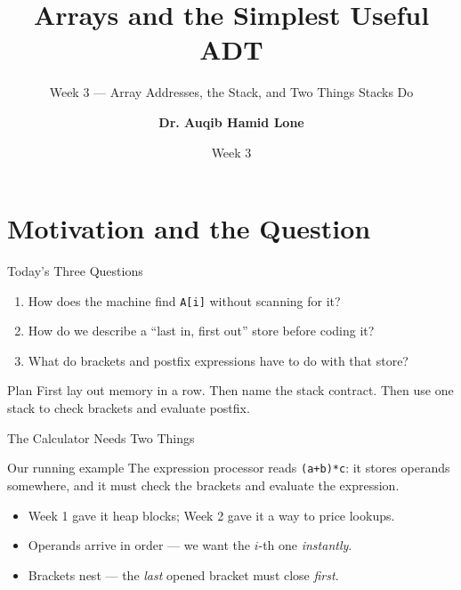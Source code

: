 \documentclass[aspectratio=169]{beamer}
\title{Arrays and the Simplest Useful ADT}
\subtitle{Week 3 --- Array Addresses, the Stack, and Two Things Stacks Do}
\author[Dr. Auqib Hamid Lone]{\textbf{Dr. Auqib Hamid Lone}}
\institute[GCET Ganderbal]{PCC CS-301: Data Structures\\GCET, Ganderbal}
\date[Week 3]{\small Week 3}
\begin{document}
\frame{\titlepage}

\section{Motivation and the Question}

\begin{frame}{Today's Three Questions}
  \begin{enumerate}
    \item How does the machine find \texttt{A[i]} without scanning for it?
    \item How do we describe a ``last in, first out'' store before coding it?
    \item What do brackets and postfix expressions have to do with that store?
  \end{enumerate}
  \vspace{0.2cm}
  \begin{exampleblock}{Plan}
    First lay out memory in a row. Then name the stack contract. Then use one
    stack to check brackets and evaluate postfix.
  \end{exampleblock}
\end{frame}

\begin{frame}{The Calculator Needs Two Things}
  \begin{alertblock}{Our running example}
    The expression processor reads \texttt{(a+b)*c}: it stores operands
    somewhere, and it must check the brackets and evaluate the expression.
  \end{alertblock}
  \begin{itemize}
    \item Week 1 gave it heap blocks; Week 2 gave it a way to price lookups.
    \item Operands arrive in order --- we want the $i$-th one \emph{instantly}.
    \item Brackets nest --- the \emph{last} opened bracket must close
      \emph{first}.
  \end{itemize}
\end{frame}
\end{document}
